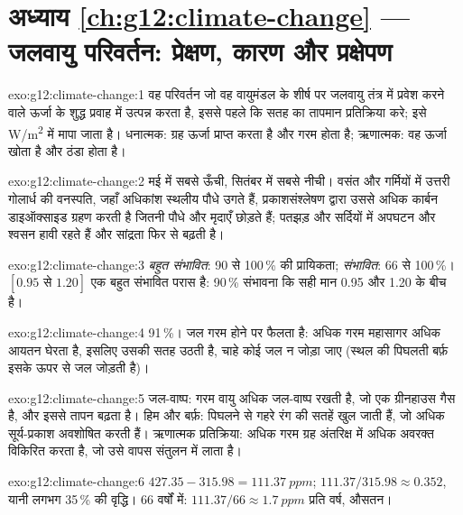 \section*{अध्याय \ref{ch:g12:climate-change} --- जलवायु परिवर्तन: प्रेक्षण, कारण और प्रक्षेपण}

\begin{solution}{exo:g12:climate-change:1}
वह परिवर्तन जो वह वायुमंडल के शीर्ष पर जलवायु तंत्र में प्रवेश करने वाले ऊर्जा के शुद्ध प्रवाह में
उत्पन्न करता है, इससे पहले कि सतह का तापमान प्रतिक्रिया करे;
इसे \unit{W/m^2} में मापा जाता है। धनात्मक: ग्रह ऊर्जा प्राप्त करता है और गरम होता है;
ऋणात्मक: वह ऊर्जा खोता है और ठंडा होता है।
\end{solution}

\begin{solution}{exo:g12:climate-change:2}
मई में सबसे ऊँची, सितंबर में सबसे नीची। वसंत और गर्मियों में उत्तरी गोलार्ध की
वनस्पति, जहाँ अधिकांश स्थलीय पौधे उगते हैं, प्रकाशसंश्लेषण द्वारा उससे अधिक
कार्बन डाइऑक्साइड ग्रहण करती है जितनी पौधे और मृदाएँ छोड़ते हैं; पतझड़
और सर्दियों में अपघटन और श्वसन हावी रहते हैं और सांद्रता फिर से बढ़ती है।
\end{solution}

\begin{solution}{exo:g12:climate-change:3}
\emph{बहुत संभावित}: 90 से 100\,\% की प्रायिकता; \emph{संभावित}: 66 से
100\,\%। $[0.95 \text{ से } 1.20]$ एक बहुत संभावित परास है: 90\,\% संभावना कि
सही मान 0.95 और 1.20 के बीच है।
\end{solution}

\begin{solution}{exo:g12:climate-change:4}
91\,\%। जल गरम होने पर फैलता है: अधिक गरम महासागर अधिक आयतन घेरता है, इसलिए
उसकी सतह उठती है, चाहे कोई जल न जोड़ा जाए (स्थल की पिघलती बर्फ़ इसके ऊपर से
जल जोड़ती है)।
\end{solution}

\begin{solution}{exo:g12:climate-change:5}
जल-वाष्प: गरम वायु अधिक जल-वाष्प रखती है, जो एक ग्रीनहाउस गैस है, और इससे
तापन बढ़ता है। हिम और बर्फ़: पिघलने से गहरे रंग की सतहें खुल जाती हैं, जो
अधिक सूर्य-प्रकाश अवशोषित करती हैं। ऋणात्मक प्रतिक्रिया: अधिक गरम ग्रह अंतरिक्ष में अधिक अवरक्त
विकिरित करता है, जो उसे वापस संतुलन में लाता है।
\end{solution}

\begin{solution}{exo:g12:climate-change:6}
$427.35 - 315.98 = \qty{111.37}{ppm}$; $111.37/315.98 \approx 0.352$, यानी
लगभग 35\,\% की वृद्धि। 66 वर्षों में: $111.37/66 \approx
\qty{1.7}{ppm}$ प्रति वर्ष, औसतन।
\end{solution}


